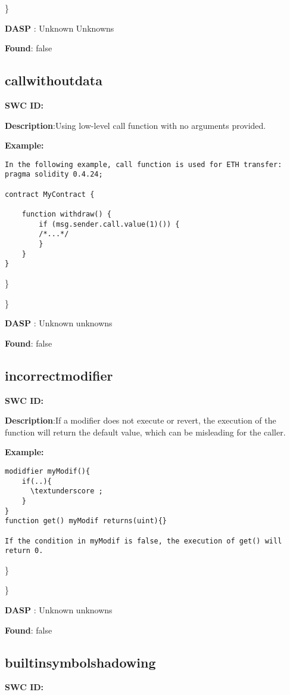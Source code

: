 \documentclass{article}
\begin{document}
\} 

\textbf{DASP} : Unknown Unknowns

\textbf{Found}: false

\subsection{call\textunderscore without\textunderscore data} 
\textbf{SWC \textunderscore ID:} 

\textbf{Description}:Using low-level call function with no arguments provided.


\textbf{Example:} 
\begin{verbatim}
In the following example, call function is used for ETH transfer:
pragma solidity 0.4.24;

contract MyContract {

    function withdraw() {
        if (msg.sender.call.value(1)()) {
        /*...*/
        }
    }
}

\end{verbatim}\} 

\} 

\textbf{DASP} : Unknown unknowns

\textbf{Found}: false

\subsection{incorrect\textunderscore modifier} 
\textbf{SWC \textunderscore ID:} 

\textbf{Description}:If a modifier does not execute \textunderscore  or revert, the execution of the function will return the default value, which can be misleading for the caller.


\textbf{Example:} 
\begin{verbatim}
modidfier myModif(){
    if(..){
      \textunderscore ;
    }
}
function get() myModif returns(uint){}

If the condition in myModif is false, the execution of get() will return 0.

\end{verbatim}\} 

\} 

\textbf{DASP} : Unknown unknowns

\textbf{Found}: false

\subsection{builtin\textunderscore symbol\textunderscore shadowing} 
\textbf{SWC \textunderscore ID:} 
\end{document}
